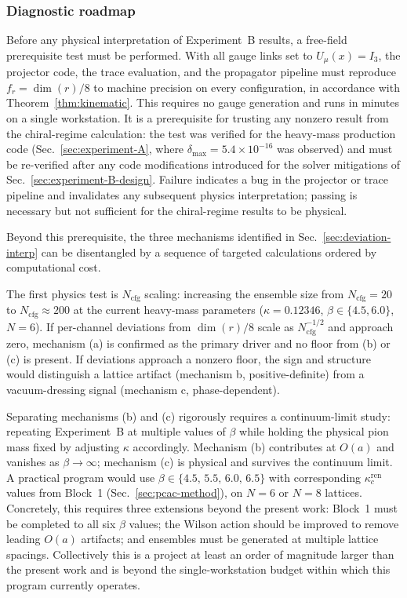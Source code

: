 \documentclass[12pt]{article}
\theoremstyle{definition}
\theoremstyle{remark}
\newcommand{\kcren}{\kappa_{c}^{\mathrm{ren}}}      %
\newcommand{\Ncfg}{N_{\mathrm{cfg}}}                  %
\begin{document}
	\subsubsection{Diagnostic roadmap}
	\label{sec:diagnostic-roadmap}
	
	Before any physical interpretation of Experiment~B results, a free-field
	prerequisite test must be performed.  With all gauge links set to
	$U_\mu(x)=I_3$, the projector code, the trace evaluation, and the propagator
	pipeline must reproduce $f_r=\dim(r)/8$ to machine precision on every
	configuration, in accordance with Theorem~\ref{thm:kinematic}.  This requires
	no gauge generation and runs in minutes on a single workstation.  It is a
	prerequisite for trusting any nonzero result from the chiral-regime
	calculation: the test was verified for the heavy-mass production code
	(Sec.~\ref{sec:experiment-A}, where $\delta_{\max}=5.4\times10^{-16}$ was
	observed) and must be re-verified after any code modifications introduced for
	the solver mitigations of Sec.~\ref{sec:experiment-B-design}.  Failure
	indicates a bug in the projector or trace pipeline and invalidates any
	subsequent physics interpretation; passing is necessary but not sufficient for
	the chiral-regime results to be physical.
	
	Beyond this prerequisite, the three mechanisms identified in
	Sec.~\ref{sec:deviation-interp} can be disentangled by a sequence of targeted
	calculations ordered by computational cost.
	
	The first physics test is $\Ncfg$ scaling: increasing the ensemble size from
	$\Ncfg=20$ to $\Ncfg\approx200$ at the current heavy-mass parameters
	($\kappa=0.12346$, $\beta\in\{4.5,6.0\}$, $N=6$).  If per-channel deviations
	from $\dim(r)/8$ scale as $\Ncfg^{-1/2}$ and approach zero, mechanism (a)
	is confirmed as the primary driver and no floor from (b) or (c) is present.
	If deviations approach a nonzero floor, the sign and structure would
	distinguish a lattice artifact (mechanism b, positive-definite) from a
	vacuum-dressing signal (mechanism c, phase-dependent).
	
	Separating mechanisms (b) and (c) rigorously requires a continuum-limit study:
	repeating Experiment~B at multiple values of $\beta$ while holding the physical
	pion mass fixed by adjusting $\kappa$ accordingly.  Mechanism (b) contributes
	at $O(a)$ and vanishes as $\beta\to\infty$; mechanism (c) is physical and
	survives the continuum limit.  A practical program would use
	$\beta\in\{4.5,\,5.5,\,6.0,\,6.5\}$ with corresponding $\kcren$ values from
	Block~1 (Sec.~\ref{sec:pcac-method}), on $N=6$ or $N=8$ lattices.  Concretely,
	this requires three extensions beyond the present work: Block~1 must be
	completed to all six $\beta$ values; the Wilson action should be improved to
	remove leading $O(a)$ artifacts; and ensembles must be generated at multiple
	lattice spacings.  Collectively this is a project at least an order of
	magnitude larger than the present work and is beyond the single-workstation
	budget within which this program currently operates.
	
\end{document}
